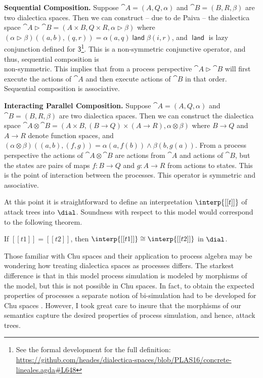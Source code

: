{\begin{changemargin}{2pt}{2pt}\noindent
\textbf{Sequential Composition.} Suppose $\cat{A} = (A , Q, \alpha)$
and $\cat{B} = (B , R , \beta)$ are two dialectica spaces.  Then we can
construct -- due to de Paiva \cite{dePaiva:2014a} -- the dialectica
space $\cat{A} \rhd \cat{B} = (A \times B, Q \times R, \alpha \rhd
\beta)$ where $(\alpha \rhd \beta)((a,b) , (q , r)) = \alpha(a , q)
\mathop{\mathsf{land}} \beta(i , r)$, and $\mathop{\mathsf{land}}$ is
lazy conjunction defined for $\mathsf{3}$\footnote{See the formal
  development for the full definition:
  \url{https://github.com/heades/dialectica-spaces/blob/PLAS16/concrete-lineales.agda\#L648}}.
This is a non-symmetric conjunctive operator, and thus, sequential
composition is \\non-symmetric.  This implies that from a process
perspective $\cat{A} \rhd \cat{B}$ will first execute the actions of
$\cat{A}$ and then execute actions of $\cat{B}$ in that order.
Sequential composition is associative.
\end{changemargin}

\begin{changemargin}{2pt}{2pt}\noindent
\textbf{Interacting Parallel Composition.} Suppose $\cat{A} = (A , Q,
\alpha)$ and $\cat{B} = (B , R , \beta)$ are two dialectica spaces.
Then we can construct the dialectica space $\cat{A} \otimes \cat{B} =
(A \times B, (B \rightarrow Q) \times (A \rightarrow R), \alpha
\otimes \beta)$ where $B \to Q$ and $A \to R$ denote function spaces,
and $(\alpha \otimes \beta)((a, b) , (f, g)) = \alpha(a , f(b)) \land
\beta(b,g(a))$.  From a process perspective the actions of $\cat{A}
\otimes \cat{B}$ are actions from $\cat{A}$ and actions of $\cat{B}$,
but the states are pairs of maps $f : B \to Q$ and $g : A \to R$ from
actions to states.  This is the point of interaction between the
processes.  This operator is symmetric and associative.
\end{changemargin}
} At this point it is straightforward to define an interpretation
$\interp{[[t]]}$ of attack trees into $\dial$.  Soundness with respect
to this model would correspond to the following theorem.

\begin{theorem}[Soundness]
  \label{thm:soundness}
  If $[[t1]] = [[t2]]$, then $\interp{[[t1]]} \cong \interp{[[t2]]}$ in $\dial$.
\end{theorem}

Those familiar with Chu spaces and their application to process
algebra may be wondering how treating dialectica spaces as processes
differs.  The starkest difference is that in this model process
simulation is modeled by morphisms of the model, but this is not
possible in Chu spaces.  In fact, to obtain the expected properties of
processes a separate notion of bi-simulation had to be developed for
Chu spaces \cite{Gupta:1994}.  However, I took great care to insure
that the morphisms of our semantics capture the desired properties of
process simulation, and hence, attack trees.

